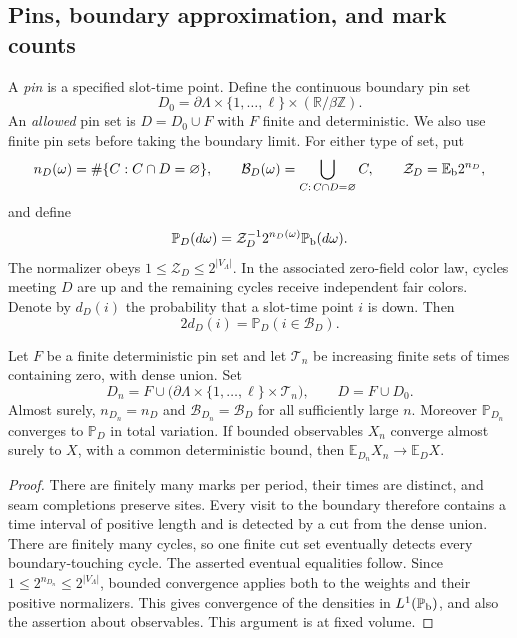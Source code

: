 \subsection{Pins, boundary approximation, and mark counts}

A \emph{pin} is a specified slot-time point.  Define the continuous
boundary pin set
\[
       D_0=\partial\Lambda\times\{1,\ldots,\ell\}
                                   \times(\mathbb R/\beta\mathbb Z).
\]
An \emph{allowed} pin set is $D=D_0\cup F$ with $F$ finite and
deterministic.  We also use finite pin sets before taking the boundary
limit.  For either type of set, put
\[
 n_D(\omega)=\#\{C:C\cap D=\varnothing\},\qquad
 \mathcal B_D(\omega)=\bigcup_{C:\,C\cap D=\varnothing}C,
 \qquad \mathcal Z_D=\mathbb E_{\rm b}2^{n_D},
\]
and define
\begin{equation}\label{eq:pinned-law}
 \mathbb P_D(d\omega)=\mathcal Z_D^{-1}2^{n_D(\omega)}
                                        \mathbb P_{\rm b}(d\omega).
\end{equation}
The normalizer obeys $1\le\mathcal Z_D\le2^{|V_\Lambda|}$.
In the associated zero-field color law, cycles meeting $D$ are up and
the remaining cycles receive independent fair colors.  Denote by
$d_D(i)$ the probability that a slot-time point $i$ is down.  Then
\begin{equation}\label{eq:down-free-cycle}
                  2d_D(i)=\mathbb P_D(i\in\mathcal B_D).
\end{equation}

\begin{lemma}\label{lem:dense-boundary}
Let $F$ be a finite deterministic pin set and let $\mathcal T_n$ be
increasing finite sets of times containing zero, with dense union.
Set
\[
 D_n=F\cup\bigl(\partial\Lambda\times\{1,\ldots,\ell\}
                                      \times\mathcal T_n\bigr),
 \qquad D=F\cup D_0.
\]
Almost surely, $n_{D_n}=n_D$ and $\mathcal B_{D_n}=\mathcal B_D$ for
all sufficiently large $n$.  Moreover $\mathbb P_{D_n}$ converges to
$\mathbb P_D$ in total variation.  If bounded observables $X_n$
converge almost surely to $X$, with a common deterministic bound,
then $\mathbb E_{D_n}X_n\to\mathbb E_DX$.
\end{lemma}

\begin{proof}
There are finitely many marks per period, their times are distinct,
and seam completions preserve sites.  Every visit to the boundary
therefore contains a time interval of positive length and is detected
by a cut from the dense union.  There are finitely many cycles, so one
finite cut set eventually detects every boundary-touching cycle.
The asserted eventual equalities follow.  Since
$1\le2^{n_{D_n}}\le2^{|V_\Lambda|}$, bounded convergence applies both
to the weights and their positive normalizers.  This gives convergence
of the densities in $L^1(\mathbb P_{\rm b})$, and also the assertion
about observables.  This argument is at fixed volume.
\end{proof}

